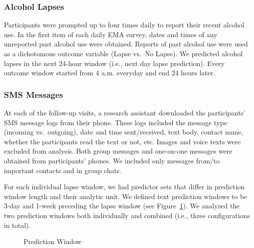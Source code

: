 \documentclass[
  letterpaper,
  DIV=11,
  numbers=noendperiod]{scrartcl}
\begin{document}
\subsubsection{Alcohol Lapses}\label{alcohol-lapses}

Participants were prompted up to four times daily to report their recent
alcohol use. In the first item of each daily EMA survey, dates and times
of any unreported past alcohol use were obtained. Reports of past
alcohol use were used as a dichotomous outcome variable (Lapse vs.~No
Lapse). We predicted alcohol lapses in the next 24-hour window (i.e.,
next day lapse prediction). Every outcome window started from 4 a.m.
everyday and end 24 hours later.

\subsubsection{SMS Messages}\label{sms-messages}

At each of the follow-up visits, a research assistant downloaded the
participants' SMS message logs from their phone. These logs included the
message type (incoming vs.~outgoing), date and time sent/received, text
body, contact name, whether the participants read the text or not, etc.
Images and voice texts were excluded from analysis. Both group messages
and one-on-one messages were obtained from participants' phones. We
included only messages from/to important contacts and in group chats.

For each individual lapse window, we had predictor sets that differ in
prediction window length and their analytic unit. We defined text
prediction windows to be 3-day and 1-week preceding the lapse window
(see Figure~\ref{fig-window}). We analyzed the two prediction windows
both individually and combined (i.e., three configurations in total).

\begin{figure}


\caption{\label{fig-window}Prediction Window}

\end{figure}%
\end{document}

